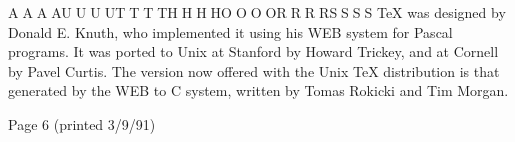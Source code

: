      AAAAUUUUTTTTHHHHOOOORRRRSSSS
          TeX was designed by Donald E. Knuth, who implemented it
          using his WEB system for Pascal programs.  It was ported to
          Unix at Stanford by Howard Trickey, and at Cornell by Pavel
          Curtis.  The version now offered with the Unix TeX
          distribution is that generated by the WEB to C system,
          written by Tomas Rokicki and Tim Morgan.




































     Page 6                                           (printed 3/9/91)



